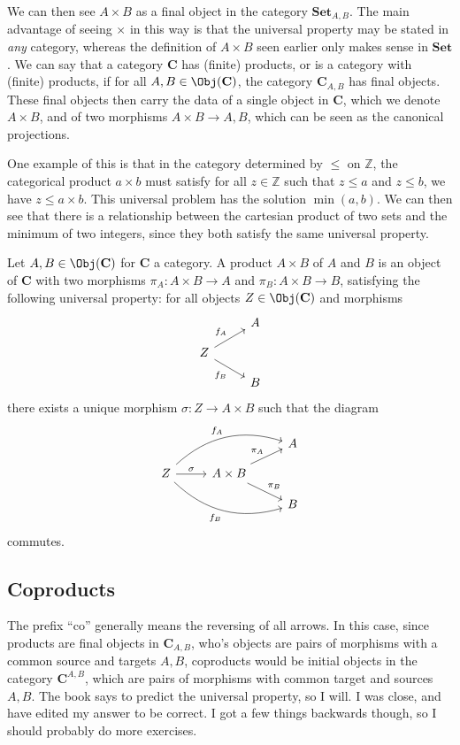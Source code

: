 We can then see $A\times B$ as a final object in the category $\mathbf{Set}_{A,B}$. The main advantage of seeing $\times $ in this way is that the universal property may be stated in \emph{any} category, whereas the definition of $A\times B$ seen earlier only makes sense in $\mathbf{Set}$. We can say that a category $\mathbf{C}$ has (finite) products, or is a category with (finite) products, if for all $A,B\in \Obj( \mathbf{C} ) $, the category $\mathbf{C}_{A,B}$ has final objects. These final objects then carry the data of a single object in $\mathbf{C}$, which we denote $A\times B$, and of two morphisms $A\times B\to A,B$, which can be seen as the canonical projections.

One example of this is that in the category determined by $\leq $ on $\mathbb{Z}$, the categorical product $a\times b$ must satisfy for all $z\in\mathbb{Z}$ such that $z\leq a$ and $z\leq b$, we have $z\leq a\times b$. This universal problem has the solution $\min (a,b)$. We can then see that there is a relationship between the cartesian product of two sets and the minimum of two integers, since they both satisfy the same universal property.
\begin{definition}[Product]\label{dfn:1.5.2}
	Let $A,B\in \Obj( \mathbf{C} ) $ for $\mathbf{C}$ a category. A product $A\times B$ of $A$ and $B$ is an object of $\mathbf{C}$ with two morphisms $\pi_A : A\times B \to A$ and $\pi _B : A\times B \to B$, satisfying the following universal property: for all objects $Z\in \Obj( \mathbf{C} ) $ and morphisms
	\[\begin{tikzcd}[row sep=1em, column sep=2.5em]
		&A\\
		Z\arrow[ur,"f_A"]\arrow[dr,"f_B"']\\
		&B
	\end{tikzcd}\]
	there exists a unique morphism $\sigma : Z \to A\times B$ such that the diagram
\[\begin{tikzcd}[row sep=1em, column sep=2.5em]
	&&A\\
	Z\arrow[urr, bend left, "f_A"]\arrow[r,"\sigma "]\arrow[drr,bend right,"f_B"']&A\times B\arrow[ur,"\pi_A"]\arrow[dr,"\pi _B"]\\
										      &&B
\end{tikzcd}\]
commutes.
\end{definition}
\subsection{Coproducts}
The prefix ``co'' generally means the reversing of all arrows. In this case, since products are final objects in $\mathbf{C}_{A,B}$, who's objects are pairs of morphisms with a common source and targets $A,B$, coproducts would be initial objects in the category $\mathbf{C}^{A,B}$, which are pairs of morphisms with common target and sources $A,B$. The book says to predict the universal property, so I will. I was close, and have edited my answer to be correct. I got a few things backwards though, so I should probably do more exercises.


